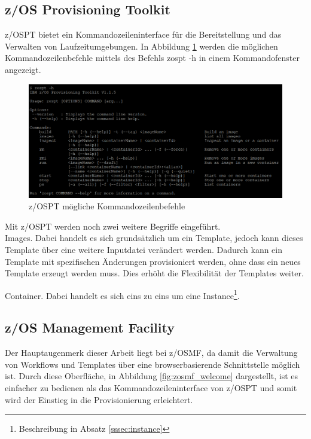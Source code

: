 \subsection{z/OS Provisioning Toolkit}\label{sssec:zospt}
z/OSPT bietet ein Kommandozeileninterface für die Bereitstellung und das Verwalten von Laufzeitumgebungen.
In Abbildung \ref{fig:zospt_help} werden die möglichen Kommandozeilenbefehle mittels des Befehls \glqq zospt -h\grqq{} in einem Kommandofenster angezeigt.
\begin{figure}[h]
	\centering
	\includegraphics[width=\textwidth]{figures/zospt_help_putty.png}
	\caption{z/OSPT mögliche Kommandozeilenbefehle}
	\label{fig:zospt_help}
\end{figure}
Mit z/OSPT werden noch zwei weitere Begriffe eingeführt.\\
\glqq Images\grqq{}.
Dabei handelt es sich grundsätzlich um ein Template, jedoch kann dieses Template über eine weitere Inputdatei verändert werden.
Dadurch kann ein Template mit spezifischen Änderungen provisioniert werden, ohne dass ein neues Template erzeugt werden muss.
Dies erhöht die Flexibilität der Templates weiter.

\glqq Container\grqq{}.
Dabei handelt es sich eins zu eins um eine \glqq Instance\grqq \footnote{Beschreibung in Absatz \ref{sssec:instance}}.
\cite{IBM.2019b}

\subsection{z/OS Management Facility}\label{sssec:zosmf}
Der Hauptaugenmerk dieser Arbeit liegt  bei z/OSMF, da damit die Verwaltung von Workflows und Templates über eine browserbasierende Schnittstelle möglich ist.
Durch diese Oberfläche, in Abbildung \ref{fig:zosmf_welcome} dargestellt, ist es einfacher zu bedienen als das Kommandozeileninterface von z/OSPT  und somit wird der Einstieg in die Provisionierung erleichtert.


